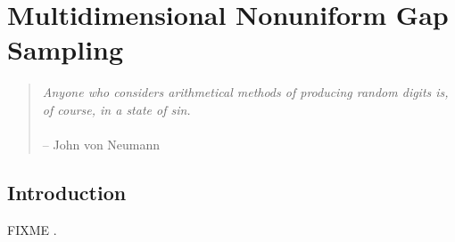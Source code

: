 
\chapter{Multidimensional Nonuniform Gap Sampling}

\begin{quote}
{\it
  Anyone who considers arithmetical methods of producing random digits is,
  of course, in a state of sin.}
\\\\
 -- John von Neumann
\end{quote}

\section{Introduction}

FIXME \cite{mobli:jmr2015}.




